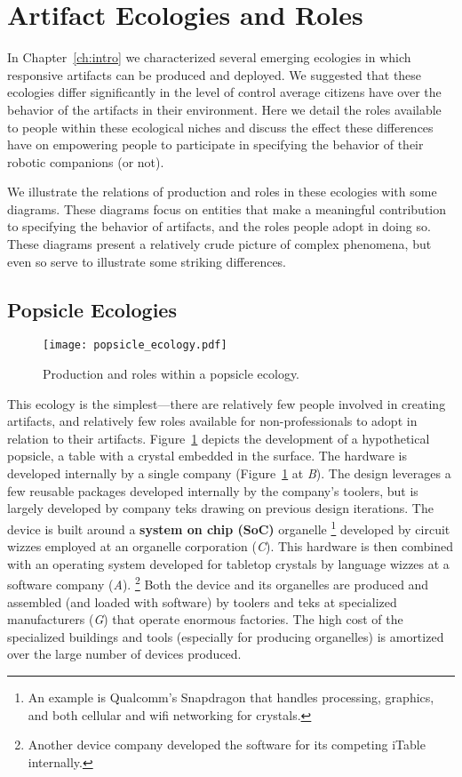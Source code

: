 \section{Artifact Ecologies and Roles}
\label{sec:artifact_ecologies}
%
In Chapter~\ref{ch:intro} we characterized several emerging ecologies in which responsive artifacts can be produced and deployed. We suggested that these ecologies differ significantly in the level of control average citizens have over the behavior of the artifacts in their environment. Here we detail the roles available to people within these ecological niches and discuss the effect these differences have on empowering people to participate in specifying the behavior of their robotic companions (or not).

We illustrate the relations of production and roles in these ecologies with some diagrams. These diagrams focus on entities that make a meaningful contribution to specifying the behavior of artifacts, and the roles people adopt in doing so. These diagrams present a relatively crude picture of complex phenomena, but even so serve to illustrate some striking differences.

\subsection{Popsicle Ecologies}
%
\begin{figure}[b!]
  \centering
    \texttt{[image: popsicle\_ecology.pdf]}
  \caption{Production and roles within a popsicle ecology.}
  \label{fig:popsicle_ecology}
\end{figure}
%
This ecology is the simplest---there are relatively few people involved in creating artifacts, and relatively few roles available for non-professionals to adopt in relation to their artifacts.
Figure~\ref{fig:popsicle_ecology} depicts the development of a hypothetical popsicle, a table with a crystal embedded in the surface.
The hardware is developed internally by a single company (Figure~\ref{fig:popsicle_ecology} at \emph{B}). The design leverages a few reusable packages developed internally by the company's toolers, but is largely developed by company teks drawing on previous design iterations. The device is built around  a \textbf{system on chip (SoC)} organelle%
\footnote{An example is Qualcomm's Snapdragon that handles processing, graphics, and both cellular and wifi networking for crystals.}
developed by circuit wizzes employed at an organelle corporation (\emph{C}).
This hardware is then combined with an operating system developed for tabletop crystals by language wizzes at a software company (\emph{A}).%
\footnote{Another device company developed the software for its competing iTable internally.} 
Both the device and its organelles are produced and assembled (and loaded with software) by toolers and teks at specialized manufacturers (\emph{G}) that operate enormous factories. 
The high cost of the specialized buildings and tools (especially for producing organelles) is amortized over the large number of devices produced.


